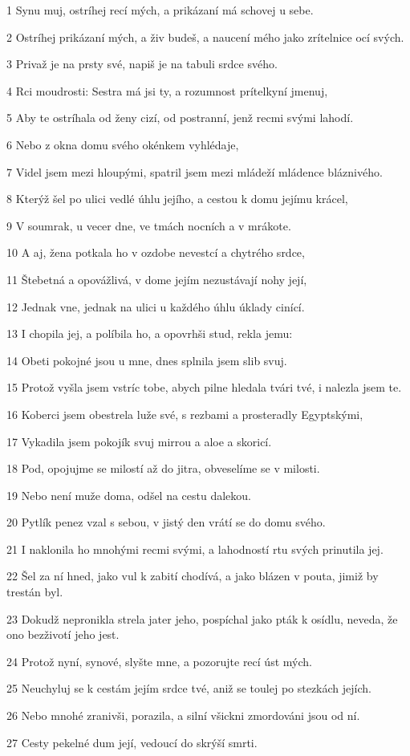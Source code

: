 \par 1 Synu muj, ostríhej recí mých, a prikázaní má schovej u sebe.
\par 2 Ostríhej prikázaní mých, a živ budeš, a naucení mého jako zrítelnice ocí svých.
\par 3 Privaž je na prsty své, napiš je na tabuli srdce svého.
\par 4 Rci moudrosti: Sestra má jsi ty, a rozumnost prítelkyní jmenuj,
\par 5 Aby te ostríhala od ženy cizí, od postranní, jenž recmi svými lahodí.
\par 6 Nebo z okna domu svého okénkem vyhlédaje,
\par 7 Videl jsem mezi hloupými, spatril jsem mezi mládeží mládence bláznivého.
\par 8 Kterýž šel po ulici vedlé úhlu jejího, a cestou k domu jejímu krácel,
\par 9 V soumrak, u vecer dne, ve tmách nocních a v mrákote.
\par 10 A aj, žena potkala ho v ozdobe nevestcí a chytrého srdce,
\par 11 Štebetná a opovážlivá, v dome jejím nezustávají nohy její,
\par 12 Jednak vne, jednak na ulici u každého úhlu úklady cinící.
\par 13 I chopila jej, a políbila ho, a opovrhši stud, rekla jemu:
\par 14 Obeti pokojné jsou u mne, dnes splnila jsem slib svuj.
\par 15 Protož vyšla jsem vstríc tobe, abych pilne hledala tvári tvé, i nalezla jsem te.
\par 16 Koberci jsem obestrela luže své, s rezbami a prosteradly Egyptskými,
\par 17 Vykadila jsem pokojík svuj mirrou a aloe a skoricí.
\par 18 Pod, opojujme se milostí až do jitra, obveselíme se v milosti.
\par 19 Nebo není muže doma, odšel na cestu dalekou.
\par 20 Pytlík penez vzal s sebou, v jistý den vrátí se do domu svého.
\par 21 I naklonila ho mnohými recmi svými, a lahodností rtu svých prinutila jej.
\par 22 Šel za ní hned, jako vul k zabití chodívá, a jako blázen v pouta, jimiž by trestán byl.
\par 23 Dokudž nepronikla strela jater jeho, pospíchal jako pták k osídlu, neveda, že ono bezživotí jeho jest.
\par 24 Protož nyní, synové, slyšte mne, a pozorujte recí úst mých.
\par 25 Neuchyluj se k cestám jejím srdce tvé, aniž se toulej po stezkách jejích.
\par 26 Nebo mnohé zranivši, porazila, a silní všickni zmordováni jsou od ní.
\par 27 Cesty pekelné dum její, vedoucí do skrýší smrti.

